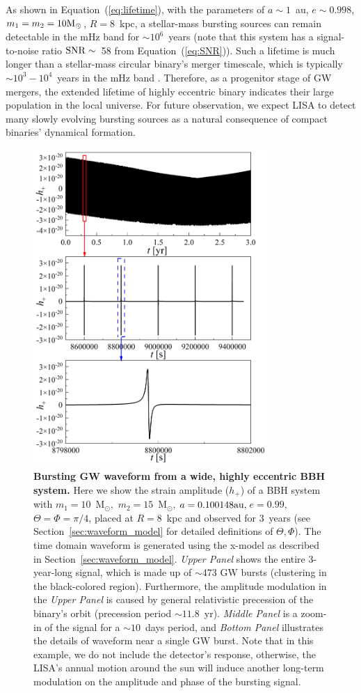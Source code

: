 \documentclass[%
 reprint,
 amsmath,amssymb,
 aps,
]{revtex4-2}
\begin{document}
As shown in Equation~(\ref{eq:lifetime}), with the parameters of $a\sim 1$~au, $ e\sim0.998$, $m_1=m_2=10{\rm M_{\odot}}$, $R=8$~kpc, a stellar-mass bursting sources can remain detectable in the mHz band for $\sim10^6$~years (note that this system has a signal-to-noise ratio $\rm SNR\sim$~58 from Equation~(\ref{eq:SNR})). Such a lifetime is much longer than a stellar-mass circular binary's merger timescale, which is typically $\sim 10^3-10^4$~years in the mHz band \citep{Peters64}. Therefore, as a progenitor stage of GW mergers, the extended lifetime of highly eccentric binary indicates their large population in the local universe. For future observation, we expect LISA to detect many slowly evolving bursting sources as a natural consequence of compact binaries' dynamical formation. 

\begin{figure}[htbp]
    \centering
    \includegraphics[width=3.5in]{waveformexample.png} 
    \caption{{\bf Bursting GW waveform from a wide, highly eccentric BBH system.} Here we show the strain amplitude ($h_{+}$) of a BBH system with $m_{1}=10$~M$_{\odot},$ $m_{2}=15$~M$_{\odot},\,$$a= 0.100148 {\rm au},\,$$e=0.99,\,$$\Theta=\Phi=\pi/4$, placed at
    $R=8$~kpc and observed for $3$~years (see Section~\ref{sec:waveform_model} for detailed definitions of $\Theta,\Phi$). The time domain waveform is generated using the x-model as described in Section~\ref{sec:waveform_model}. {\it Upper Panel} shows the entire 3-year-long signal, which is made up of $\sim473$ GW bursts (clustering in the black-colored region). Furthermore, the amplitude modulation in the {\it Upper Panel} is caused by general relativistic precession of the binary's orbit (precession period $\sim 11.8$~yr). {\it Middle Panel} is a zoom-in of the signal for a $\sim 10$~days period, and {\it Bottom Panel} illustrates the details of waveform near a single GW burst. Note that in this example, we do not include the detector's response, otherwise, the LISA's annual motion around the sun will induce another long-term modulation on the amplitude and phase of the bursting signal. 
    }
    \label{fig:egwaveform}
\end{figure}
\end{document}
